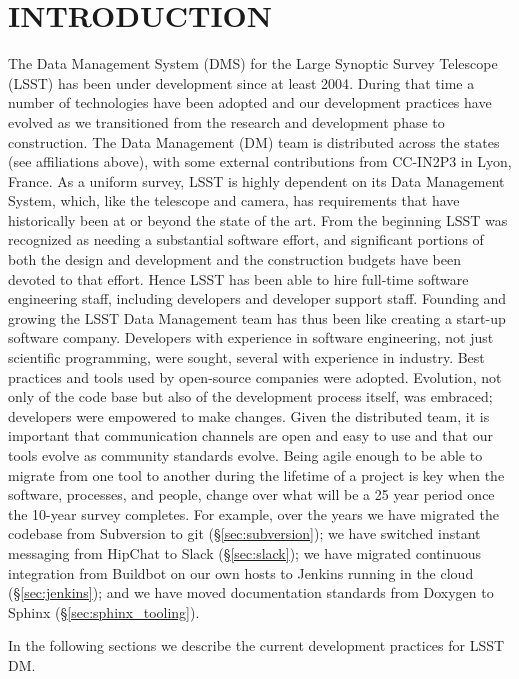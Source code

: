 \section{INTRODUCTION}

The Data Management System (DMS)\cite{2015arXiv151207914J} for the Large Synoptic Survey Telescope (LSST) \cite{2008arXiv0805.2366I} has been under development since at least 2004\cite{2004AAS...20510811A}.
During that time a number of technologies have been adopted and our development practices have evolved as we transitioned from the research and development phase to construction.
The Data Management (DM) team is distributed across the states (see affiliations above),  with some external contributions from CC-IN2P3 in Lyon, France.
As a uniform survey, LSST is highly dependent on its Data Management System, which, like the telescope and camera, has requirements that have historically been at or beyond the state of the art.
From the beginning LSST was recognized as needing a substantial software effort, and significant portions of both the design and development and the construction budgets have been devoted to that effort.
Hence LSST has been able to hire full-time software engineering staff, including developers and developer support staff.
Founding and growing the LSST Data Management team has thus been like creating a start-up software company.
Developers with experience in software engineering, not just scientific programming, were sought, several with experience in industry.
Best practices and tools used by open-source companies were adopted.
Evolution, not only of the code base but also of the development process itself, was embraced; developers were empowered to make changes.
Given the distributed team, it is important that communication channels are open and easy to use and that our tools evolve as community standards evolve.
Being agile enough to be able to migrate from one tool to another during the lifetime of a project is key when the software, processes, and people, change over what will be a 25 year period once the 10-year survey completes.
For example, over the years we have migrated the codebase from Subversion to git (\S\ref{sec:subversion}); we have switched instant messaging from HipChat to Slack (\S\ref{sec:slack}); we have migrated continuous integration from Buildbot on our own hosts to Jenkins running in the cloud (\S\ref{sec:jenkins}); and we have moved documentation standards from Doxygen to Sphinx (\S\ref{sec:sphinx_tooling}).

In the following sections we describe the current development practices for LSST DM.
